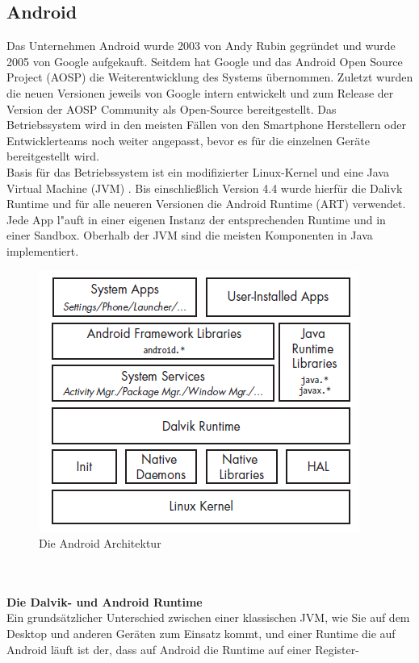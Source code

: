 \subsection{Android}
	Das Unternehmen Android wurde 2003 von Andy Rubin gegründet und wurde 2005 von
	Google aufgekauft. Seitdem hat Google und das Android Open Source Project
	(AOSP) die Weiterentwicklung des Systems übernommen. Zuletzt wurden die neuen
	Versionen jeweils von Google intern entwickelt und zum Release der Version der
	AOSP Community als Open-Source bereitgestellt. Das Betriebssystem wird in den
	meisten Fällen von den Smartphone Herstellern oder Entwicklerteams noch weiter
	angepasst, bevor es für die einzelnen Geräte bereitgestellt wird.\\
	Basis für das Betriebssystem ist ein modifizierter Linux-Kernel und eine Java
	Virtual Machine (JVM) \cite{ArtDalvik}. Bis einschließlich Version 4.4 wurde
	hierfür die Dalivk Runtime und für alle neueren Versionen die Android Runtime
	(ART) verwendet. Jede App l"auft in einer eigenen Instanz der entsprechenden
	Runtime und in einer Sandbox. Oberhalb der JVM sind die meisten Komponenten in
	Java implementiert.
	\begin{figure}[h]
		\centering
		\includegraphics[width=0.7\linewidth]{android_pages/graphics/architektur_android_.png}
		\caption{Die Android Architektur \protect\cite[S. 2]{Elenkov2014} }
		\label{fig:architektur_android}
	\end{figure}
	\\\\
	\textbf{Die Dalvik- und Android Runtime}\\
	Ein grundsätzlicher Unterschied zwischen einer klassischen JVM, wie Sie auf
	dem Desktop und anderen Geräten zum Einsatz kommt, und einer Runtime die auf
	Android läuft ist der, dass auf Android die Runtime auf einer Register-
